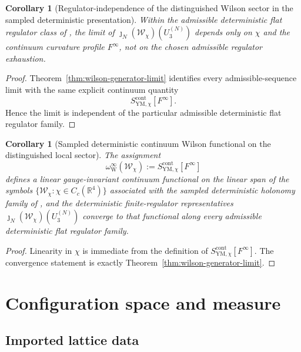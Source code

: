 \documentclass[11pt]{article}
\newtheorem{corollary}[theorem]{Corollary}
\theoremstyle{remark}
\newcommand{\R}{\mathbb R}
\begin{document}
\begin{corollary}[Regulator-independence of the distinguished Wilson sector in the sampled deterministic presentation]
\label{cor:wilson-generator-independence}
Within the admissible deterministic flat regulator class of \cite{continuumqft},
the limit of \(\jmath_N(\mathcal W_\chi)(U_3^{(N)})\) depends only on
\(\chi\) and the continuum curvature profile \(F^\infty\), not on the chosen
admissible regulator exhaustion.
\end{corollary}

\begin{proof}
Theorem~\ref{thm:wilson-generator-limit} identifies every admissible-sequence
limit with the same explicit continuum quantity
\[
S_{\mathrm{YM},\chi}^{\mathrm{cont}}[F^\infty].
\]
Hence the limit is independent of the particular admissible deterministic flat
regulator family.
\end{proof}

\begin{corollary}[Sampled deterministic continuum Wilson functional on the distinguished local sector]
\label{cor:continuum-wilson-functional}
The assignment
\[
\omega_{\mathrm W}^\infty(\mathcal W_\chi)
:=
S_{\mathrm{YM},\chi}^{\mathrm{cont}}[F^\infty]
\]
defines a linear gauge-invariant continuum functional on the linear span of the
symbols \(\{\mathcal W_\chi:\chi\in C_c(\R^4)\}\) associated with the sampled
deterministic holonomy family of \cite{continuumqft}, and the
deterministic finite-regulator representatives
\(\jmath_N(\mathcal W_\chi)(U_3^{(N)})\) converge to that functional along every
admissible deterministic flat regulator family.
\end{corollary}

\begin{proof}
Linearity in \(\chi\) is immediate from the definition of
\(S_{\mathrm{YM},\chi}^{\mathrm{cont}}[F^\infty]\).  The convergence statement
is exactly Theorem~\ref{thm:wilson-generator-limit}.
\end{proof}

\section{Configuration space and measure}
\label{sec:config}

\subsection{Imported lattice data}
\end{document}

